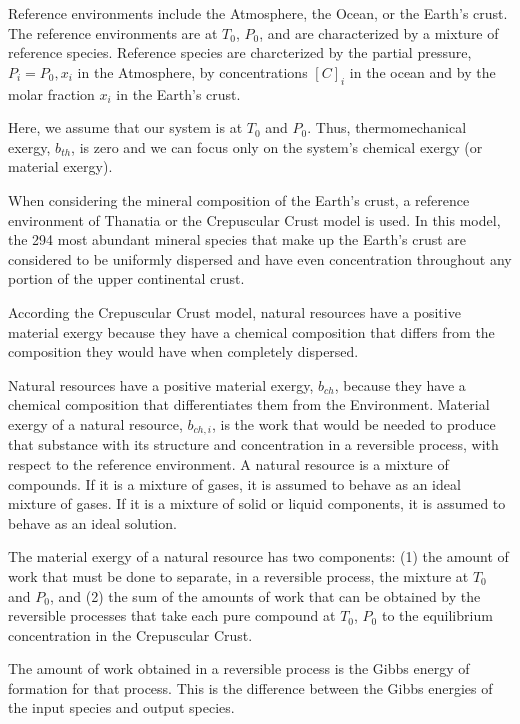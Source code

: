 \documentclass[energies,article,submit,pdftex,moreauthors]{Definitions/mdpi}
\begin{document}
Reference environments include the Atmosphere,
the Ocean, or the Earth's crust.
The reference environments are at $T_{0}$, $P_{0}$, and are
characterized by a mixture of reference species.
Reference species are charcterized by the partial pressure,
$P_{i}=P_{0}, x_{i}$ in the Atmosphere,
by concentrations $[C]_{i}$ in the ocean
and by the molar fraction $x_{i}$ in the Earth's crust.

Here, we assume that our system is at
$T_{0}$ and $P_{0}$.
Thus, thermomechanical exergy, $b_{th}$, is zero
and we can focus only on the system's chemical exergy
(or material exergy).

When considering the mineral composition
of the Earth's crust,
a reference environment of Thanatia
or the Crepuscular Crust model is used.
In this model, the 294 most abundant mineral species
that make up the Earth's crust
are considered to be uniformly dispersed
and have even concentration throughout any portion
of the upper continental crust.

According the Crepuscular Crust model,
natural resources have a positive material exergy
because they have a chemical composition that
differs from the composition they would have when
completely dispersed.

Natural resources have a positive material exergy, $b_{ch}$,
because they have a chemical composition
that differentiates them from the Environment.
Material exergy of a natural resource, $b_{ch,i}$,
is the work that would be needed
to produce that substance with its
structure and concentration
in a reversible process,
with respect to the reference environment.
A natural resource is a mixture of compounds.
If it is a mixture of gases,
it is assumed to behave as an ideal mixture of gases.
If it is a mixture of solid or liquid components,
it is assumed to behave as an ideal solution.

The material exergy of a natural resource
has two components:
(1) the amount of work that must be done
to separate, in a reversible process, the mixture
at $T_{0}$ and $P_{0}$, and
(2) the sum of the amounts of work
that can be obtained by the reversible processes
that take each pure compound at $T_{0}$, $P_{0}$
to the equilibrium concentration in the Crepuscular Crust.

The amount of work obtained
in a reversible process is the Gibbs energy
of formation for that process.
This is the difference between the Gibbs energies
of the input species and output species.
\end{document}
